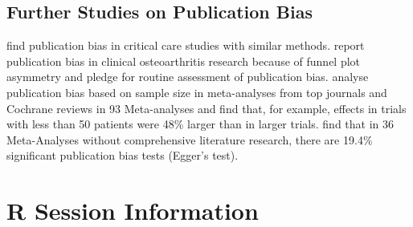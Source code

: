 \documentclass[11pt,a4paper,twoside]{book}\usepackage[]{graphicx}\usepackage[]{color}
\begin{document}
\subsection{Further Studies on Publication Bias}
\citealp{Zhang.2013} find publication bias in critical care studies with similar methods. \citealp{Nusch} report publication bias in clinical osteoarthritis research because of funnel plot asymmetry and pledge for routine assessment of publication bias. \citealp{Dechartres.2013} analyse publication bias based on sample size in meta-analyses from top journals and Cochrane reviews in 93 Meta-analyses and find that, for example, effects in trials with less than 50 patients were 48\% larger than in larger trials. \citealp{Onishi.2014} find that in 36 Meta-Analyses without comprehensive literature research, there are 19.4\% significant publication bias tests (Egger's test).



\section{R Session Information}
\end{document}
